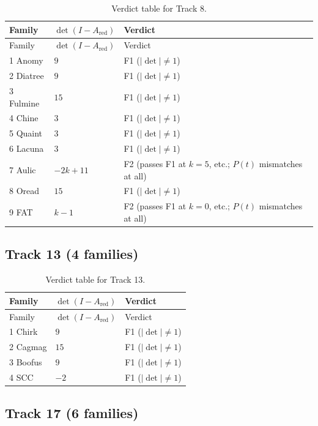 \begin{longtable}{@{}l l >{\raggedright\arraybackslash}p{}@{}}
\caption{Verdict table for Track 8.}\\
\toprule
Family & $\det(I-A_{\text{red}})$ & Verdict \\
\midrule
\endfirsthead
\toprule
Family & $\det(I-A_{\text{red}})$ & Verdict \\
\midrule
\endhead
1 Anomy & $9$ & F1 ($|\det| \neq 1$) \\
2 Diatree & $9$ & F1 ($|\det| \neq 1$) \\
3 Fulmine & $15$ & F1 ($|\det| \neq 1$) \\
4 Chine & $3$ & F1 ($|\det| \neq 1$) \\
5 Quaint & $3$ & F1 ($|\det| \neq 1$) \\
6 Lacuna & $3$ & F1 ($|\det| \neq 1$) \\
7 Aulic & $-2k+11$ & F2 (passes F1 at $k = 5$, etc.; $P(t)$ mismatches at all) \\
8 Oread & $15$ & F1 ($|\det| \neq 1$) \\
9 FAT & $k-1$ & F2 (passes F1 at $k = 0$, etc.; $P(t)$ mismatches at all) \\
\bottomrule
\end{longtable}

\subsection{Track 13 (4 families)}

\begin{longtable}{@{}l l >{\raggedright\arraybackslash}p{}@{}}
\caption{Verdict table for Track 13.}\\
\toprule
Family & $\det(I-A_{\text{red}})$ & Verdict \\
\midrule
\endfirsthead
\toprule
Family & $\det(I-A_{\text{red}})$ & Verdict \\
\midrule
\endhead
1 Chirk & $9$ & F1 ($|\det| \neq 1$) \\
2 Cagmag & $15$ & F1 ($|\det| \neq 1$) \\
3 Boofus & $9$ & F1 ($|\det| \neq 1$) \\
4 SCC & $-2$ & F1 ($|\det| \neq 1$) \\
\bottomrule
\end{longtable}

\subsection{Track 17 (6 families)}

